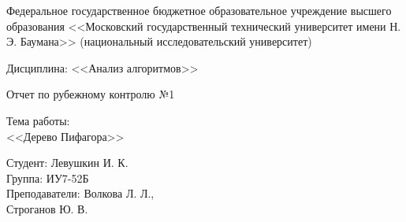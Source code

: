 \documentclass[a4paper,12pt]{article}
\begin{document}
	
	\large
	\begin{center}
		Федеральное государственное бюджетное образовательное учреждение 
		высшего образования <<Московский государственный технический 
		университет имени Н. Э. Баумана>> 
		(национальный исследовательский университет)
	\end{center}
	
	\vspace*{30mm} 
	
	\huge
	\begin{center}
		Дисциплина: <<Анализ алгоритмов>>
		
		Отчет по рубежному контролю №1
	\end{center}
	
	\vspace*{30mm} 
	
	\huge
	\begin{center}
		Тема работы:\\
		<<Дерево Пифагора>>
	\end{center}
	\vspace*{30mm} 
	
	\large
	\begin{flushright}
		Студент: Левушкин И. К. \\
		Группа: ИУ7-52Б \\
		Преподаватели: Волкова Л. Л., \\ Строганов Ю. В. \\
	\end{flushright}
	
\end{document}
